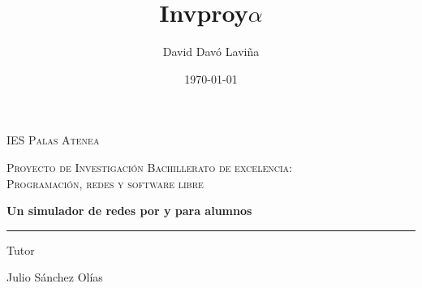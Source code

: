 \documentclass[a4paper, 11pt]{report} %
\title{Invproy\space $\alpha$}
\author{David Davó Laviña}
\date{\today{}}
\begin{document}

\makeatletter
\begin{titlepage}
\centering
\vspace*{1cm}
{\scshape\LARGE IES Palas Atenea \par}
\vspace{2cm}
{\scshape\Large Proyecto de Investigación Bachillerato de excelencia:\\
Programación, redes y software libre\par}
\vspace{1.5cm}
{\fontsize{35pt}{40pt}\bfseries\color{DarkRed} \@title\par}
{\huge\bfseries Un simulador de redes por y para alumnos \par}
{\color{DarkRed}\rule{0.5\textwidth}{1pt}\par}
\vspace{2cm}
{\Large\itshape \@author\par}
\vfill
Tutor\par
Julio Sánchez Olías

\vfill

{\large \@date\par}
\end{titlepage}
\clearpage
{}



\renewcommand\cftchapfont{\bf\color{chaptercolour}}
\renewcommand\cftchappagefont{\bf\color{chaptercolour}}
\end{document}
